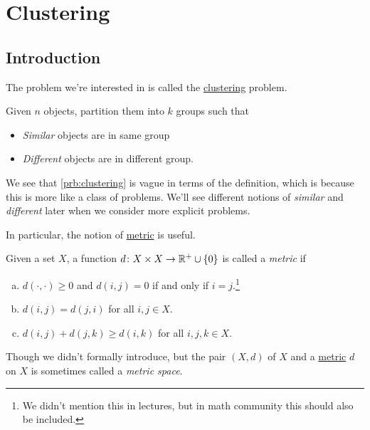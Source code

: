\chapter{Clustering}

\section{Introduction}

The problem we're interested in is called the \hyperref[prb:clustering]{clustering} problem.

\begin{problem}[Clustering]\label{prb:clustering}
Given \(n\) objects, partition them into \(k\) groups such that
\begin{itemize}
	\item \emph{Similar} objects are in same group
	\item \emph{Different} objects are in different group.
\end{itemize}
\end{problem}

\begin{note}
	We see that \autoref{prb:clustering} is vague in terms of the definition, which is because this is more like a class of problems. We'll see different notions of \emph{similar} and \emph{different} later when we consider more explicit problems.
\end{note}

In particular, the notion of \hyperref[def:metric]{metric} is useful.

\begin{definition}[Metric]\label{def:metric}
	Given a set \(X\), a function \(d\colon X\times X\to \mathbb{\MakeUppercase{r}} ^+ \cup \left\{ 0 \right\} \) is called a \emph{metric} if
	\begin{enumerate}[(a)]
		\item \(d(\cdot, \cdot) \geq 0\) and \(d(i, j) = 0\) if and only if \(i = j\).\footnote{We didn't mention this in lectures, but in math community this should also be included.}
		\item \(d(i, j) = d(j, i)\) for all \(i, j\in X\).
		\item \(d(i, j) + d(j, k) \geq d(i, k)\) for all \(i, j, k\in X\).
	\end{enumerate}
\end{definition}

\begin{remark}\label{rmk:metric-space}
	Though we didn't formally introduce, but the pair \((X, d)\) of \(X\) and a \hyperref[def:metric]{metric} \(d\) on \(X\) is sometimes called a \emph{metric space}.
\end{remark}

